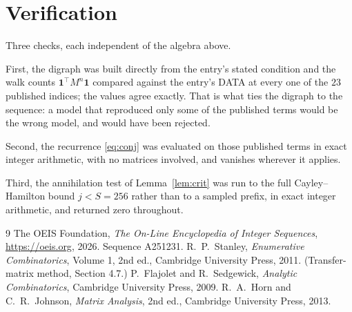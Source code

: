 \documentclass[11pt,a4paper]{article}
\theoremstyle{plain}
\theoremstyle{definition}
\begin{document}
\section{Verification}

Three checks, each independent of the algebra above.

First, the digraph was built directly from the entry's stated condition and the walk counts
$\mathbf{1}^{\!\top}M^{n}\mathbf{1}$ compared against the entry's DATA at every one of
the $23$ published indices; the values agree exactly. That is what ties the digraph to
the sequence: a model that reproduced only some of the published terms would be the wrong
model, and would have been rejected.

Second, the recurrence \eqref{eq:conj} was evaluated on those published terms in exact
integer arithmetic, with no matrices involved, and vanishes wherever it applies.

Third, the annihilation test of Lemma~\ref{lem:crit} was run to the full Cayley--Hamilton
bound $j<S=256$ rather than to a sampled prefix, in exact integer arithmetic, and returned
zero throughout.

\begin{thebibliography}{9}
 The OEIS Foundation, \emph{The On-Line Encyclopedia of Integer
Sequences}, \url{https://oeis.org}, 2026. Sequence A251231.
 R.~P.~Stanley, \emph{Enumerative Combinatorics}, Volume 1, 2nd ed.,
Cambridge University Press, 2011. (Transfer-matrix method, Section 4.7.)
 P.~Flajolet and R.~Sedgewick, \emph{Analytic Combinatorics}, Cambridge
University Press, 2009.
 R.~A.~Horn and C.~R.~Johnson, \emph{Matrix Analysis}, 2nd ed., Cambridge
University Press, 2013.
\end{thebibliography}
\end{document}
